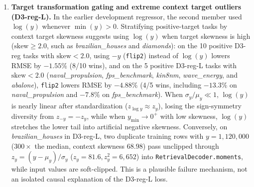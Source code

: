 \documentclass[11pt]{article}
\begin{document}
\begin{enumerate}
An audit of the upstream \texttt{tabicl} graph~v3 categorical size sampler revealed that because the flag \texttt{use\_corrected\_cat\_sizes} defaults to \texttt{False}, \texttt{graph v3} ignores \texttt{max\_cat\_size=200} and caps categorical cardinality at $\min(10, d_{\max}+1) = 10$ ($2\dots 9$ levels).
Consequently, during regression fine-tuning the model never saw a categorical column with more than 9 levels.
On \emph{Food\_Delivery\_Time} ($n_{\text{train}}=30{,}300$), column \texttt{Delivery\_person\_ID} has 1,320 levels ($\sim 23$ rows per level) and negative out-of-fold target-encoding $\mathrm{R}^2$ ($-0.039$ at smoothing $\alpha=1.0$; $-0.001$ even at $\alpha=100$): the diagnostic encoding did not show useful predictive signal in that split.
A noisy high-cardinality ID is therefore a plausible source of overfitting, rather than necessarily a missed signal. In the diagnostic split, dropping it reduces HistGradientBoosting RMSE to $7.480$, close to CatBoost $7.419$ (the older LightPFN run scored $7.891$). This is an HGB intervention, not evidence that dropping the ID fixes LightPFN.
\item \textbf{Target transformation gating and extreme context target outliers (D3-reg-L).}
In the earlier development regressor, the second member used $\log(y)$ whenever $\min(y) > 0$.
Stratifying positive-target tasks by context target skewness suggests using $\log(y)$ when target skewness is high ($\text{skew} \ge 2.0$, such as \emph{brazilian\_houses} and \emph{diamonds}): on the 10 positive D3-reg tasks with $\text{skew} < 2.0$, using $-y$ (\texttt{flip2}) instead of $\log(y)$ lowers RMSE by $-1.55\%$ (8/10 wins), and on the 5 positive D3-reg-L tasks with $\text{skew} < 2.0$ (\emph{naval\_propulsion}, \emph{fps\_benchmark}, \emph{kin8nm}, \emph{wave\_energy}, and \emph{abalone}), \texttt{flip2} lowers RMSE by \textbf{$-4.88\%$} (4/5 wins, including $-13.3\%$ on \emph{naval\_propulsion} and $-7.8\%$ on \emph{fps\_benchmark}). %
When $\sigma_y / \mu_y \ll 1$, $\log(y)$ is nearly linear after standardization ($z_{\log y} \approx z_y$), losing the sign-symmetry diversity from $z_{-y} = -z_y$, while when $y_{\min} \to 0^+$ with low skewness, $\log(y)$ stretches the lower tail into artificial negative skewness.
Conversely, on \emph{brazilian\_houses} in D3-reg-L, two duplicate training rows with $y = 1{,}120{,}000$ ($300\times$ the median, context skewness $68.98$) pass unclipped through $z_y = (y-\mu_y)/\sigma_y$ ($z_y = 81.6, z_y^2 = 6{,}652$) into \texttt{RetrievalDecoder.moments}, while input values are soft-clipped. This is a plausible failure mechanism, not an isolated causal explanation of the D3-reg-L loss. %

\end{enumerate}
\end{document}
